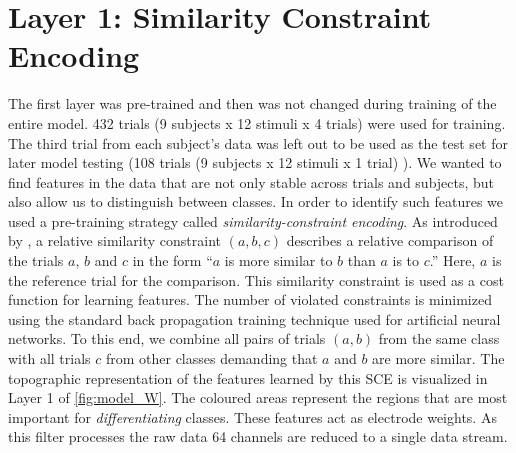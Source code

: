 \section{Layer 1: Similarity Constraint Encoding}
The first layer was pre-trained and then was not changed during training of the entire model. 
432 trials (9 subjects x 12 stimuli x 4 trials) were used for training. 
The third trial from each subject's data was left out to be used as the test set for later model testing (108 trials (9 subjects x 12 stimuli x 1 trial) ).
We wanted to find features in the data that are not only stable across trials and subjects, but also allow us to distinguish between classes. 
In order to identify such features we used a pre-training strategy called \emph{similarity-constraint encoding}.
As introduced by \cite{schultz_learning_2004}, a relative similarity constraint $(a,b,c)$ describes a relative comparison of the trials $a$, $b$ and $c$ in the form ``$a$ is more similar to $b$ than $a$ is to $c$.''
Here, $a$ is the reference trial for the comparison.
This similarity constraint is used as a cost function for learning features. 
The number of violated constraints is minimized using the standard back propagation training technique used for artificial neural networks.
To this end, we combine all pairs of trials $(a,b)$ from the same class %
with all trials $c$ from other classes demanding that $a$ and $b$ are more similar.
The topographic representation of the features learned by this \ac{SCE} is visualized in Layer 1 of \autoref{fig:model_W}. 
The coloured areas represent the regions that are most important for \emph{differentiating} classes. 
These features act as electrode weights.
As this filter processes the raw data 64 channels are reduced to a single data stream. 

